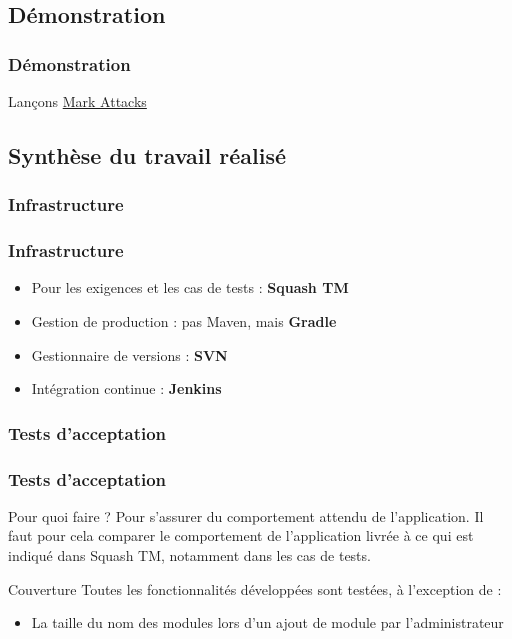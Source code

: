 \documentclass{beamer}
\begin{document}
    \subsection{Démonstration}
    \begin{frame}
      \frametitle{Démonstration}
      \begin{center}
        {\LARGE Lançons \href{http://localhost/m2test6/markattaks-tmp/website/}{Mark Attacks}}
      \end{center}
    \end{frame}
    
    \subsection{Synthèse du travail réalisé}
    
      \subsubsection{Infrastructure}
      \begin{frame}
        \frametitle{Infrastructure}
        \begin{block}{}
          \begin{itemize}
            \item Pour les exigences et les cas de tests : \textbf{Squash TM}
            \item Gestion de production : pas Maven, mais \textbf{Gradle}
            \item Gestionnaire de versions : \textbf{SVN}
            \item Intégration continue : \textbf{Jenkins}
          \end{itemize}
        \end{block}
      \end{frame}
      
      \subsubsection{Tests d'acceptation}
      \begin{frame}
        \frametitle{Tests d'acceptation}
        \begin{block}{Pour quoi faire ?}
          Pour s'assurer du comportement attendu de l'application. Il faut pour cela comparer le comportement de l'application livrée à ce qui est indiqué dans Squash TM, notamment dans les cas de tests.
        \end{block}
        \begin{block}{Couverture}
          Toutes les fonctionnalités développées sont testées, à l'exception de :
          \begin{itemize}
            \item La taille du nom des modules lors d'un ajout de module par l'administrateur
          \end{itemize}
        \end{block}
      \end{frame}
      
\end{document}
